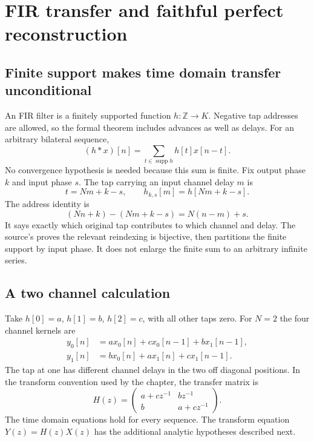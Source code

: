 \section{FIR transfer and faithful perfect reconstruction}
\subsection{Finite support makes time domain transfer unconditional}
An FIR filter is a finitely supported function $h:\mathbb Z\to K$. Negative tap addresses are allowed, so the formal theorem includes advances as well as delays. For an arbitrary bilateral sequence,
\[
(h*x)[n]=\sum_{t\in\operatorname{supp}h}h[t]x[n-t].
\]
No convergence hypothesis is needed because this sum is finite.
Fix output phase $k$ and input phase $s$. The tap carrying an input channel delay $m$ is
\[
t=Nm+k-s,\qquad h_{k,s}[m]=h[Nm+k-s].
\]
The address identity is
\[
(Nn+k)-(Nm+k-s)=N(n-m)+s.
\]
It says exactly which original tap contributes to which channel and delay. The source's  proves the relevant reindexing is bijective, then partitions the finite support by input phase. It does not enlarge the finite sum to an arbitrary infinite series.

\subsection{A two channel calculation}
\begin{microexample}[title={Three taps and their channel delays}]
Take $h[0]=a$, $h[1]=b$, $h[2]=c$, with all other taps zero. For $N=2$ the four channel kernels are
\[
\begin{aligned}
y_0[n]&=a x_0[n]+c x_0[n-1]+b x_1[n-1],\\
y_1[n]&=b x_0[n]+a x_1[n]+c x_1[n-1].
\end{aligned}
\]
The tap at one has different channel delays in the two off diagonal positions. In the transform convention used by the chapter, the transfer matrix is
\[
H(z)=\begin{pmatrix}a+c z^{-1}&b z^{-1}\\b&a+c z^{-1}\end{pmatrix}.
\]
The time domain equations hold for every sequence. The transform equation $Y(z)=H(z)X(z)$ has the additional analytic hypotheses described next.

\end{microexample}

